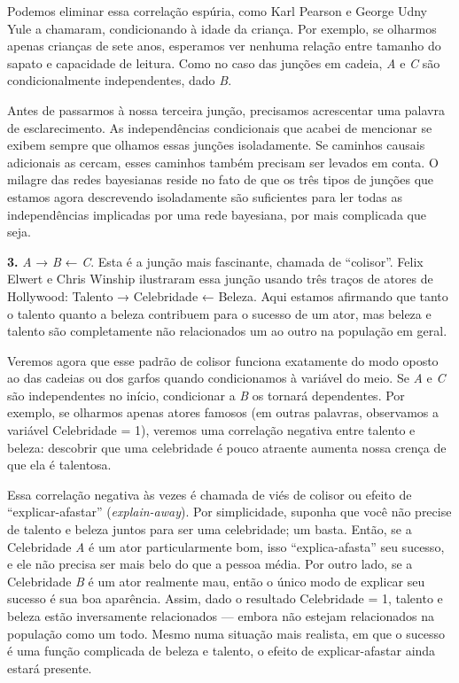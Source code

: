 \documentclass[11pt,a5paper,twoside]{book}
\begin{document}
Podemos eliminar essa correlação espúria, como Karl Pearson e George Udny Yule a chamaram, condicionando à idade da criança. Por exemplo, se olharmos apenas crianças de sete anos, esperamos ver nenhuma relação entre tamanho do sapato e capacidade de leitura. Como no caso das junções em cadeia, \textit{A} e \textit{C} são condicionalmente independentes, dado \textit{B}.

Antes de passarmos à nossa terceira junção, precisamos acrescentar uma palavra de esclarecimento. As independências condicionais que acabei de mencionar se exibem sempre que olhamos essas junções isoladamente. Se caminhos causais adicionais as cercam, esses caminhos também precisam ser levados em conta. O milagre das redes bayesianas reside no fato de que os três tipos de junções que estamos agora descrevendo isoladamente são suficientes para ler todas as independências implicadas por uma rede bayesiana, por mais complicada que seja.

\textbf{3.} \textit{A} → \textit{B} ← \textit{C}. Esta é a junção mais fascinante, chamada de “colisor”. Felix Elwert e Chris Winship ilustraram essa junção usando três traços de atores de Hollywood: Talento → Celebridade ← Beleza. Aqui estamos afirmando que tanto o talento quanto a beleza contribuem para o sucesso de um ator, mas beleza e talento são completamente não relacionados um ao outro na população em geral.

Veremos agora que esse padrão de colisor funciona exatamente do modo oposto ao das cadeias ou dos garfos quando condicionamos à variável do meio. Se \textit{A} e \textit{C} são independentes no início, condicionar a \textit{B} os tornará dependentes. Por exemplo, se olharmos apenas atores famosos (em outras palavras, observamos a variável Celebridade = 1), veremos uma correlação negativa entre talento e beleza: descobrir que uma celebridade é pouco atraente aumenta nossa crença de que ela é talentosa.

Essa correlação negativa às vezes é chamada de viés de colisor ou efeito de “explicar-afastar” (\textit{explain-away}). Por simplicidade, suponha que você não precise de talento e beleza juntos para ser uma celebridade; um basta. Então, se a Celebridade \textit{A} é um ator particularmente bom, isso “explica-afasta” seu sucesso, e ele não precisa ser mais belo do que a pessoa média. Por outro lado, se a Celebridade \textit{B} é um ator realmente mau, então o único modo de explicar seu sucesso é sua boa aparência. Assim, dado o resultado Celebridade = 1, talento e beleza estão inversamente relacionados — embora não estejam relacionados na população como um todo. Mesmo numa situação mais realista, em que o sucesso é uma função complicada de beleza e talento, o efeito de explicar-afastar ainda estará presente.
\end{document}
